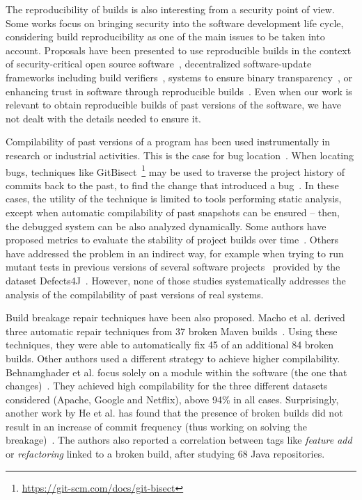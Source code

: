 The reproducibility of builds is also interesting from a security point of view.
Some works focus on bringing security into the software development life cycle, considering build reproducibility as one of the main issues to be taken into account. Proposals have been presented to use reproducible builds in the context of security-critical open source software~\cite{deCarnedeCarnavalet:2014:CIV:2664243.2664288}, decentralized software-update frameworks including build verifiers~\cite{nikitin2017chainiac}, systems to ensure binary transparency~\cite{hassan2017automatic}, or enhancing trust in software through reproducible builds~\cite{Skrimstad:Thesis:2018}.
Even when our work is relevant to obtain reproducible builds of past versions of the software, we have not dealt with the details needed to ensure it.

Compilability of past versions of a program has been used instrumentally in research or industrial activities.
This is the case for bug location~\cite{Sliwerski:2005:CIF:1083142.1083147,Asaduzzaman:2012:BIC:2664446.2664463,Murgia:2010:MLA:1852786.1852794,Zimmermann:2006:MVA:1137983.1138001,Zimmermann2008}.
When locating bugs, techniques like GitBisect~\footnote{\url{https://git-scm.com/docs/git-bisect}} may be used to traverse the project history of commits back to the past, to find the change that introduced a bug~\cite{spinellis2012git,meneely2013patch}. 
In these cases, the utility of the technique is limited to tools performing static analysis, except when automatic compilability of past snapshots can be ensured -- then, the debugged system can be also analyzed dynamically.
Some authors have proposed metrics to evaluate the stability of project builds over time~\cite{6405296}.
Others have addressed the problem in an indirect way, for example when trying to run mutant tests in previous versions of several software projects~\cite{Just:2014:MVS:2635868.2635929} provided by the dataset Defects4J~\cite{Just:2014:DDE:2610384.2628055}. However, none of those studies systematically addresses the analysis of the compilability of past versions of real systems.

Build breakage repair techniques have been also proposed. Macho et al. derived three automatic repair techniques from 37 broken Maven builds~\cite{macho2018automatically}. 
Using these techniques, they were able to automatically fix 45 of an additional 84 broken builds. 
Other authors used a different strategy to achieve higher compilability. Behnamghader et al. focus solely on a module within the software (the one that changes)~\cite{behnamghader2018scalable}. They achieved high compilability for the three different datasets considered (Apache, Google and Netflix), above 94\% in all cases. Surprisingly, another work by He et al. has found that the presence of broken builds did not result in an increase of commit frequency (thus working on solving the breakage)~\cite{he2020characteristics}. The authors also reported a correlation between tags like \textit{feature add} or \textit{refactoring} linked to a broken build, after studying 68 Java repositories.

